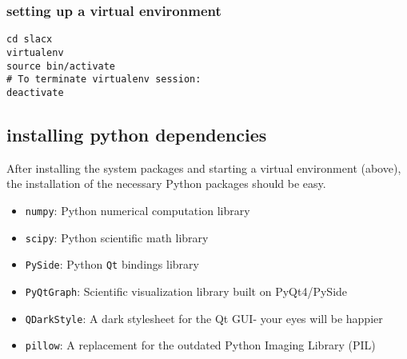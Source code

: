 \subsubsection{setting up a virtual environment}

\lstset{language=Bash}
\begin{lstlisting}
cd slacx 
virtualenv 
source bin/activate
# To terminate virtualenv session:
deactivate
\end{lstlisting}
\lstset{language=Python}

\subsection{installing python dependencies}

After installing the system packages and starting a virtual environment (above),
the installation of the necessary Python packages should be easy.
\begin{itemize}
\item \verb|numpy|: Python numerical computation library
\item \verb|scipy|: Python scientific math library
\item \verb|PySide|: Python \verb|Qt| bindings library
\item \verb|PyQtGraph|: Scientific visualization library built on PyQt4/PySide
\item \verb|QDarkStyle|: A dark stylesheet for the Qt GUI- your eyes will be happier
\item \verb|pillow|: A replacement for the outdated Python Imaging Library (PIL)
\end{itemize}


